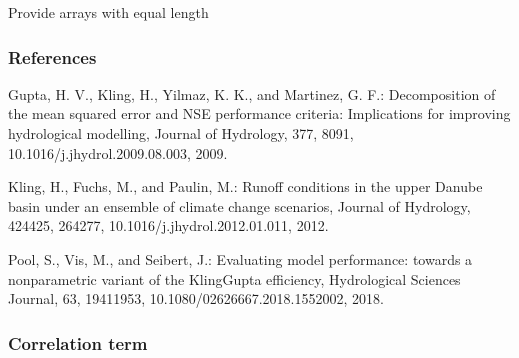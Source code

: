 \documentclass[letterpaper,10pt,english]{sphinxmanual}
\begin{document}
\begin{fulllineitems}
Provide arrays with equal length

\begin{sphinxVerbatim}[commandchars=\\\{\}]
   
   
  \PYG{p}{[}     \PYG{p}{]}
  \PYG{p}{[}     \PYG{p}{]}
 
\end{sphinxVerbatim}
\subsubsection*{References}

Gupta, H. V., Kling, H., Yilmaz, K. K., and Martinez, G. F.: Decomposition
of the mean squared error and NSE performance criteria: Implications for
improving hydrological modelling, Journal of Hydrology, 377, 80\sphinxhyphen{}91,
10.1016/j.jhydrol.2009.08.003, 2009.

Kling, H., Fuchs, M., and Paulin, M.: Runoff conditions in the upper
Danube basin under an ensemble of climate change scenarios, Journal of
Hydrology, 424\sphinxhyphen{}425, 264\sphinxhyphen{}277, 10.1016/j.jhydrol.2012.01.011, 2012.

Pool, S., Vis, M., and Seibert, J.: Evaluating model performance: towards a
non\sphinxhyphen{}parametric variant of the Kling\sphinxhyphen{}Gupta efficiency, Hydrological Sciences
Journal, 63, 1941\sphinxhyphen{}1953, 10.1080/02626667.2018.1552002, 2018.

\end{fulllineitems}



\subsubsection{Correlation term}
\label{\detokenize{reference/kge:correlation-term}}
\end{document}
